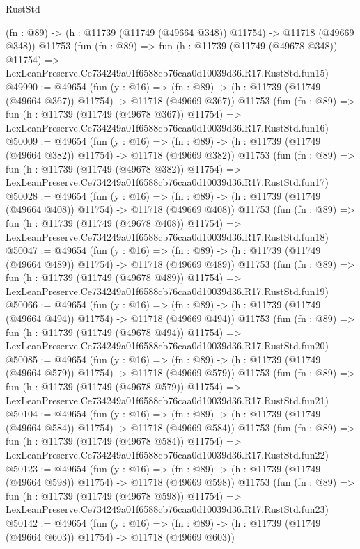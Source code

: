 \begin{lexlean}{RustStd}
\begin{coremodule}
    (fn : @89) -> (h : @11739 (@11749 (@49664 @348)) @11754) -> @11718 (@49669 @348))
    @11753
    (fun (fn : @89) =>
    fun (h : @11739 (@11749 (@49678 @348)) @11754) =>
    LexLeanPreserve.Ce734249a01f6588cb76caa0d10039d36.R17.RustStd.fun15)
@49990 := @49654
    (fun (y : @16) =>
    (fn : @89) -> (h : @11739 (@11749 (@49664 @367)) @11754) -> @11718 (@49669 @367))
    @11753
    (fun (fn : @89) =>
    fun (h : @11739 (@11749 (@49678 @367)) @11754) =>
    LexLeanPreserve.Ce734249a01f6588cb76caa0d10039d36.R17.RustStd.fun16)
@50009 := @49654
    (fun (y : @16) =>
    (fn : @89) -> (h : @11739 (@11749 (@49664 @382)) @11754) -> @11718 (@49669 @382))
    @11753
    (fun (fn : @89) =>
    fun (h : @11739 (@11749 (@49678 @382)) @11754) =>
    LexLeanPreserve.Ce734249a01f6588cb76caa0d10039d36.R17.RustStd.fun17)
@50028 := @49654
    (fun (y : @16) =>
    (fn : @89) -> (h : @11739 (@11749 (@49664 @408)) @11754) -> @11718 (@49669 @408))
    @11753
    (fun (fn : @89) =>
    fun (h : @11739 (@11749 (@49678 @408)) @11754) =>
    LexLeanPreserve.Ce734249a01f6588cb76caa0d10039d36.R17.RustStd.fun18)
@50047 := @49654
    (fun (y : @16) =>
    (fn : @89) -> (h : @11739 (@11749 (@49664 @489)) @11754) -> @11718 (@49669 @489))
    @11753
    (fun (fn : @89) =>
    fun (h : @11739 (@11749 (@49678 @489)) @11754) =>
    LexLeanPreserve.Ce734249a01f6588cb76caa0d10039d36.R17.RustStd.fun19)
@50066 := @49654
    (fun (y : @16) =>
    (fn : @89) -> (h : @11739 (@11749 (@49664 @494)) @11754) -> @11718 (@49669 @494))
    @11753
    (fun (fn : @89) =>
    fun (h : @11739 (@11749 (@49678 @494)) @11754) =>
    LexLeanPreserve.Ce734249a01f6588cb76caa0d10039d36.R17.RustStd.fun20)
@50085 := @49654
    (fun (y : @16) =>
    (fn : @89) -> (h : @11739 (@11749 (@49664 @579)) @11754) -> @11718 (@49669 @579))
    @11753
    (fun (fn : @89) =>
    fun (h : @11739 (@11749 (@49678 @579)) @11754) =>
    LexLeanPreserve.Ce734249a01f6588cb76caa0d10039d36.R17.RustStd.fun21)
@50104 := @49654
    (fun (y : @16) =>
    (fn : @89) -> (h : @11739 (@11749 (@49664 @584)) @11754) -> @11718 (@49669 @584))
    @11753
    (fun (fn : @89) =>
    fun (h : @11739 (@11749 (@49678 @584)) @11754) =>
    LexLeanPreserve.Ce734249a01f6588cb76caa0d10039d36.R17.RustStd.fun22)
@50123 := @49654
    (fun (y : @16) =>
    (fn : @89) -> (h : @11739 (@11749 (@49664 @598)) @11754) -> @11718 (@49669 @598))
    @11753
    (fun (fn : @89) =>
    fun (h : @11739 (@11749 (@49678 @598)) @11754) =>
    LexLeanPreserve.Ce734249a01f6588cb76caa0d10039d36.R17.RustStd.fun23)
@50142 := @49654
    (fun (y : @16) =>
    (fn : @89) -> (h : @11739 (@11749 (@49664 @603)) @11754) -> @11718 (@49669 @603))

\end{coremodule}
\end{lexlean}
